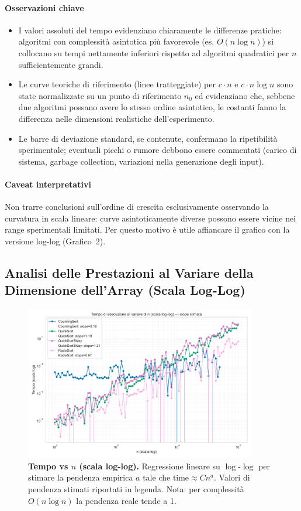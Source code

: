 \documentclass[a4paper, 11pt]{article}
\begin{document}
\paragraph{Osservazioni chiave}
\begin{itemize}
  \item I valori assoluti del tempo evidenziano chiaramente le differenze pratiche: algoritmi con complessità asintotica più favorevole (es. \(O(n\log n)\)) si collocano su tempi nettamente inferiori rispetto ad algoritmi quadratici per \(n\) sufficientemente grandi.
  \item Le curve teoriche di riferimento (linee tratteggiate) per \(c\cdot n\) e \(c\cdot n\log n\) sono state normalizzate su un punto di riferimento \(n_0\) ed evidenziano che, sebbene due algoritmi possano avere lo stesso ordine asintotico, le costanti fanno la differenza nelle dimensioni realistiche dell'esperimento.
  \item Le barre di deviazione standard, se contenute, confermano la ripetibilità sperimentale; eventuali picchi o rumore debbono essere commentati (carico di sistema, garbage collection, variazioni nella generazione degli input).
\end{itemize}

\paragraph{Caveat interpretativi}
Non trarre conclusioni sull'ordine di crescita esclusivamente osservando la curvatura in scala lineare: curve asintoticamente diverse possono essere vicine nei range sperimentali limitati. Per questo motivo è utile affiancare il grafico con la versione log-log (Grafico~2).

\subsection{Analisi delle Prestazioni al Variare della Dimensione dell'Array (Scala Log-Log)}
\begin{figure}[H]
\centering
\includegraphics[width=0.9\textwidth]{./Immagini/tempo_vs_n_loglog_improved.png}
\caption*{\textbf{Tempo vs \(n\) (scala log-log).} Regressione lineare su \(\log\)-\(\log\) per stimare la pendenza empirica \(a\) tale che \(\text{time}\approx C n^{a}\). Valori di pendenza stimati riportati in legenda. Nota: per complessità \(O(n\log n)\) la pendenza reale tende a 1.}
\label{fig:variazione_n}
\end{figure}
\end{document}
